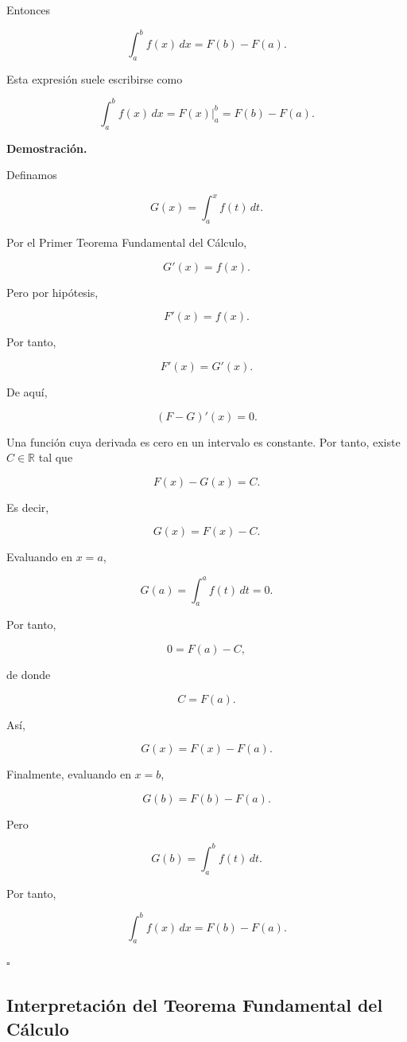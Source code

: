 \documentclass[12pt]{article}
\begin{document}
Entonces

\[
\boxed{
\int_a^b f(x)\,dx
=
F(b)-F(a).
}
\]

Esta expresión suele escribirse como

\[
\boxed{
\int_a^b f(x)\,dx
=
\left.F(x)\right|_a^b
=
F(b)-F(a).
}
\]

\textbf{Demostración.}

Definamos

\[
G(x)
=
\int_a^x f(t)\,dt.
\]

Por el Primer Teorema Fundamental del Cálculo,

\[
G'(x)=f(x).
\]

Pero por hipótesis,

\[
F'(x)=f(x).
\]

Por tanto,

\[
F'(x)=G'(x).
\]

De aquí,

\[
(F-G)'(x)=0.
\]

Una función cuya derivada es cero en un intervalo es constante. Por tanto,
existe $C\in\mathbb{R}$ tal que

\[
F(x)-G(x)=C.
\]

Es decir,

\[
G(x)=F(x)-C.
\]

Evaluando en $x=a$,

\[
G(a)
=
\int_a^a f(t)\,dt
=
0.
\]

Por tanto,

\[
0=F(a)-C,
\]

de donde

\[
C=F(a).
\]

Así,

\[
G(x)=F(x)-F(a).
\]

Finalmente, evaluando en $x=b$,

\[
G(b)=F(b)-F(a).
\]

Pero

\[
G(b)
=
\int_a^b f(t)\,dt.
\]

Por tanto,

\[
\boxed{
\int_a^b f(x)\,dx
=
F(b)-F(a).
}
\]

\hfill$\square$

\subsection{Interpretación del Teorema Fundamental del Cálculo}
\end{document}
